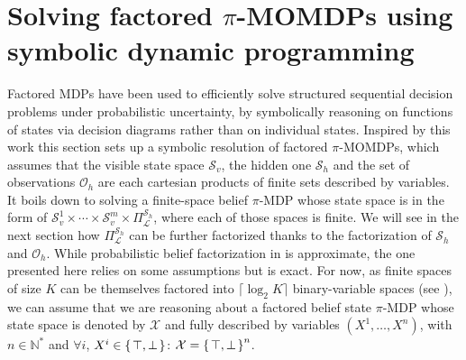 \section{Solving factored $\pi$-MOMDPs using symbolic dynamic programming} 
\label{section_PPUDD}
Factored MDPs \cite{Hoey99spudd:stochastic} 
have been used to efficiently solve structured
sequential decision problems under probabilistic uncertainty, by symbolically
reasoning on functions of states via decision diagrams rather than on individual
states. Inspired by this work this section sets up a symbolic resolution of
factored $\pi$-MOMDPs, which assumes that 
the visible state space $\mathcal{S}_v$, 
the hidden one $\mathcal{S}_h$ 
and the set of observations $\mathcal{O}_h$
are each cartesian products of finite sets described by variables. 
It boils down to solving a finite-space belief $\pi$-MDP 
whose state space is in the form of 
$\mathcal{S}^1_v \times \cdots \times \mathcal{S}^m_v \times \Pi^{\mathcal{S}_h}_{\mathcal{L}}$, 
where each of those spaces is finite. 
We will see in the next section how $\Pi^{\mathcal{S}_h}_{\mathcal{L}}$ 
can be further factorized thanks to the factorization of $\mathcal{S}_h$
and $\mathcal{O}_h$. 
While probabilistic belief factorization 
in \cite{DBLP:conf/aaai/BoyenK99,DBLP:conf/aips/ShaniPBS08} 
is approximate, the one presented here relies on some assumptions but is exact. 
For now, as finite spaces of size $K$ can be themselves
factored into $\lceil \log_2 K \rceil$ binary-variable spaces (see
\cite{Hoey99spudd:stochastic}), we can assume that we are reasoning about a
factored belief state $\pi$-MDP whose state space is denoted by $\mathcal{X}$
and fully described by variables $(X^1,\ldots,X^n)$, with  $n \in
\mathbb{N}^{\ast}$ and $\forall i$, $X^i \in \left\{ \left. \top,\bot \right. \right\}$:
$\mathcal{X} = \left\{ \left. \top,\bot \right. \right\}^n$.


